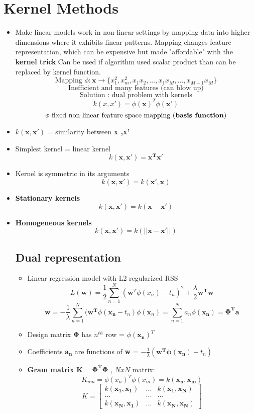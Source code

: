 \documentclass[12pt]{article} %
\begin{document}
\section{Kernel Methods}
\begin{itemize}
\item Make linear models work in non-linear settings by mapping data into higher dimensions where it exhibits linear patterns. Mapping changes feature representation, which can be expensive but made "affordable" with the \textbf{kernel trick}.Can be used if algorithm used scalar product than can be replaced by kernel function.
$$ \text{Mapping } \phi : \bm{x} \rightarrow \{ x^2_1, x_m^2,x_1x_2,...,x_1x_M,...,x_{M-1}x_M\}$$ 
$$ \text{Inefficient and many features (can blow up)}$$
$$\text{Solution : dual problem with kernels}$$
$$ k(x,x') = \phi(\bm{x})^T \phi(\bm{x'})$$
$$ \phi \text{ fixed non-linear feature space mapping (\textbf{basis function})}$$

\item $k(\bm{x},\bm{x'})$ = similarity between \textbf{x ,x'}

\item Simplest kernel = linear kernel 
$$ k(\bm{x,x'}) = \bm{x^Tx'}$$

\item Kernel is symmetric in its arguments
$$ k(\bm{x,x'})=k(\bm{x',x})$$

\item \textbf{Stationary kernels}
$$ k(\bm{x,x'}) = k(\bm{x-x'})$$

\item \textbf{Homogeneous kernels}
$$ k(\bm{x,x'}) = k(||\bm{x-x'}||)$$

\subsection{Dual representation}
\begin{itemize}
\item Linear regression model with L2 regularized RSS 
$$ L(\bm{w}) = \frac{1}{2}\sum \limits_{n=1}^{N} (\bm{w}^T \phi(x_n)-t_n)^2 + \frac{\lambda}{2}\bm{w^Tw}$$
$$ \bm{w} = -\frac{1}{\lambda} \sum \limits_{n=1}^N (\bm{w^T}\phi(\bm{x_n} -t_n)\phi(\bm{x}_n) = \sum \limits_{n=1}^N a_n \phi(\bm{x_n})= \bm{\Phi^T a} $$

\item Design matrix $\bm{\Phi}$ has $n^{th}$ row = $\phi(\bm{x_n})^T$
\item Coefficients $\bm{a_n}$ are functions of \textbf{w} = $-\frac{1}{\lambda}(\bm{w^T\phi(x_n)} -t_n)$
\item \textbf{Gram matrix} $\bm{K = \Phi^T \Phi}$ , $N x N$ matrix:
$$ K_{nm} = \phi(x_n)^T \phi(x_m)= k(\bm{x_n,x_m})$$
$$ K =\begin{bmatrix}
k(\bm{x_1,x_1}) & ... & k(\bm{x_1,x_N}) \\
... & ... &...\\
k(\bm{x_N,x_1}) & ... & k(\bm{x_N,x_N})
\end{bmatrix} $$


\end{itemize}
\end{itemize}
\end{document}
